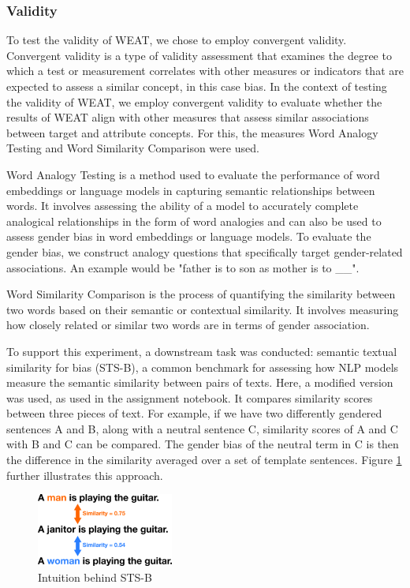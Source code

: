 \documentclass[11pt]{article}
\begin{document}
\subsubsection{Validity}
To test the validity of WEAT, we chose to employ convergent validity. Convergent validity is a type of validity assessment that examines the degree to which a test or measurement correlates with other measures or indicators that are expected to assess a similar concept, in this case bias. In the context of testing the validity of WEAT, we employ convergent validity to evaluate whether the results of WEAT align with other measures that assess similar associations between target and attribute concepts. For this, the measures Word Analogy Testing and Word Similarity Comparison were used.

Word Analogy Testing is a method used to evaluate the performance of word embeddings or language models in capturing semantic relationships between words. It involves assessing the ability of a model to accurately complete analogical relationships in the form of word analogies and can also be used to assess gender bias in word embeddings or language models. To evaluate the gender bias, we construct analogy questions that specifically target gender-related associations. An example would be "father is to son as mother is to \_\_".

Word Similarity Comparison is the process of quantifying the similarity between two words based on their semantic or contextual similarity. It involves measuring how closely related or similar two words are in terms of gender association.

To support this experiment, a downstream task was conducted: semantic textual similarity for bias (STS-B)\cite{sts-b}, a common benchmark for assessing how NLP models measure the semantic similarity between pairs of texts. Here, a modified version was used, as used in the assignment notebook. It compares similarity scores between three pieces of text. For example, if we have two differently gendered sentences A and B, along with a neutral sentence C, similarity scores of A and C with B and C can be compared. The gender bias of the neutral term in C is then the difference in the similarity averaged over a set of template sentences. Figure \ref{fig:STS-B} further illustrates this approach.

\begin{figure}[htbp]
  \centering
  \includegraphics[width=0.4\textwidth]{figures/STS-B.png}
  \caption{Intuition behind STS-B}
  \label{fig:STS-B}
\end{figure}
\end{document}
